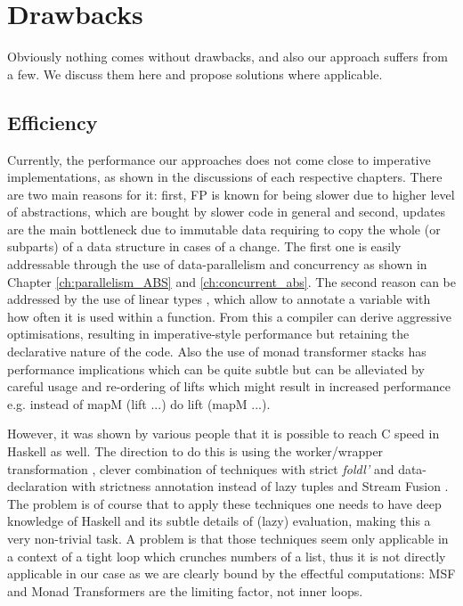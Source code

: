 \section{Drawbacks}
\label{sec:drawbacks}
Obviously nothing comes without drawbacks, and also our approach suffers from a few. We discuss them here and propose solutions where applicable.

\subsection{Efficiency}
\label{sec:drawback_efficiency}
Currently, the performance our approaches does not come close to imperative implementations, as shown in the discussions of each respective chapters. There are two main reasons for it: first, FP is known for being slower due to higher level of abstractions, which are bought by slower code in general and second, updates are the main bottleneck due to immutable data requiring to copy the whole (or subparts) of a data structure in cases of a change. The first one is easily addressable through the use of data-parallelism and concurrency as shown in Chapter \ref{ch:parallelism_ABS} and \ref{ch:concurrent_abs}. The second reason can be addressed by the use of linear types \cite{bernardy_linear_2017}, which allow to annotate a variable with how often it is used within a function. From this a compiler can derive aggressive optimisations, resulting in imperative-style performance but retaining the declarative nature of the code. Also the use of monad transformer stacks has performance implications which can be quite subtle but can be alleviated by careful usage and re-ordering of lifts which might result in increased performance e.g. instead of mapM (lift ...) do lift (mapM ...).

However, it was shown by various people  \cite{stewart_haskell_2008, stolarek_haskell_2013, kqr_competing_2017} that it is possible to reach C speed in Haskell as well. The direction to do this is using the worker/wrapper transformation \cite{gill_worker/wrapper_2009}, clever combination of techniques with strict \textit{foldl'} and data-declaration with strictness annotation instead of lazy tuples and Stream Fusion \cite{coutts_stream_2007, mainland_haskell_2013}. The problem is of course that to apply these techniques one needs to have deep knowledge of Haskell and its subtle details of (lazy) evaluation, making this a very non-trivial task. A problem is that those techniques seem only applicable in a context of a tight loop which crunches numbers of a list, thus it is not directly applicable in our case as we are clearly bound by the effectful computations: MSF and Monad Transformers are the limiting factor, not inner loops.

